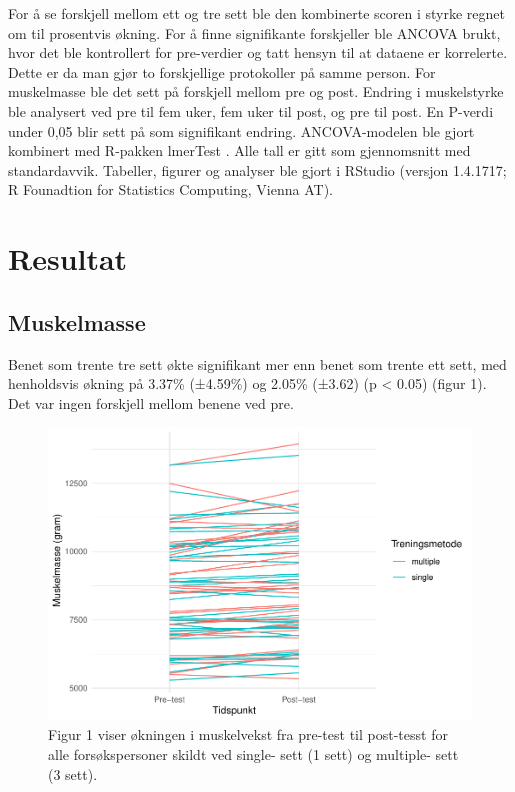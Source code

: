 \documentclass[
]{book}
\begin{document}
For å se forskjell mellom ett og tre sett ble den kombinerte scoren i styrke regnet om til prosentvis økning. For å finne signifikante forskjeller ble ANCOVA brukt, hvor det ble kontrollert for pre-verdier og tatt hensyn til at dataene er korrelerte. Dette er da man gjør to forskjellige protokoller på samme person. For muskelmasse ble det sett på forskjell mellom pre og post. Endring i muskelstyrke ble analysert ved pre til fem uker, fem uker til post, og pre til post. En P-verdi under 0,05 blir sett på som signifikant endring. ANCOVA-modelen ble gjort kombinert med R-pakken lmerTest \citep{lmerTest}. Alle tall er gitt som gjennomsnitt med standardavvik. Tabeller, figurer og analyser ble gjort i RStudio (versjon 1.4.1717; R Founadtion for Statistics Computing, Vienna AT).

\hypertarget{resultat}{%
\section{Resultat}\label{resultat}}

\hypertarget{muskelmasse}{%
\subsection{Muskelmasse}\label{muskelmasse}}

Benet som trente tre sett økte signifikant mer enn benet som trente ett sett, med henholdsvis økning på 3.37\% (±4.59\%) og 2.05\% (±3.62) (p \textless{} 0.05) (figur 1). Det var ingen forskjell mellom benene ved pre.

\begin{figure}
\centering
\includegraphics{_main_files/figure-latex/figur-1.pdf}
\caption{\label{fig:figur}Figur 1 viser økningen i muskelvekst fra pre-test til post-tesst for alle forsøkspersoner skildt ved single- sett (1 sett) og multiple- sett (3 sett).}
\end{figure}
\end{document}
